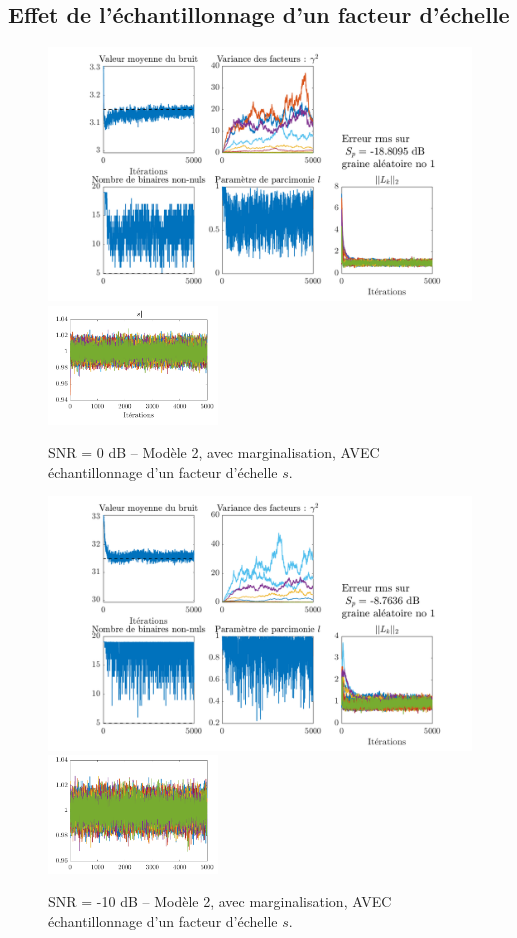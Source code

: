 \documentclass[ 12pt]{article}
\begin{document}
\subsection{Effet de l'échantillonnage d'un facteur d'échelle}
\begin{figure}[H]
	\centering
	\includegraphics[width=\textwidth]{ToyCase/scalingon.png}\\
	\includegraphics[width=0.4\textwidth]{ToyCase/s.png}
	\caption{SNR = 0 dB -- Modèle 2, avec marginalisation, AVEC échantillonnage d'un facteur d'échelle $s$.}
\end{figure}
\begin{figure}[H]
	\centering
	\includegraphics[width=\textwidth]{ToyCase/scalingon_snrm10db.png}\\
	\includegraphics[width=0.4\textwidth]{ToyCase/s_snrm10db.png}
	\caption{SNR = -10 dB -- Modèle 2, avec marginalisation, AVEC échantillonnage d'un facteur d'échelle $s$.}
\end{figure}
\end{document}
